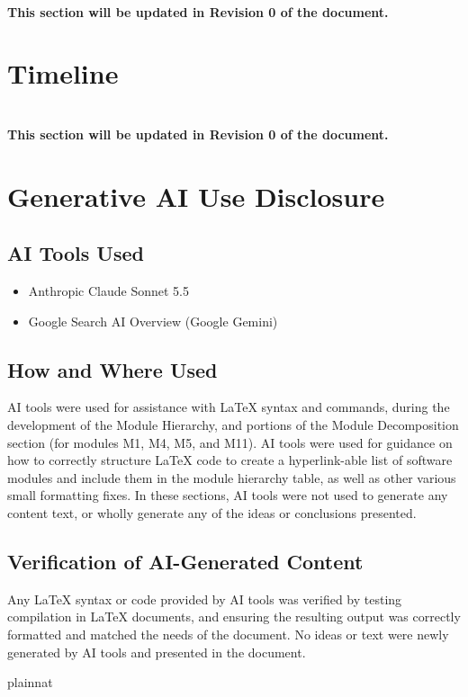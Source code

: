 \documentclass[12pt, titlepage]{article}
\begin{document}
\\

\noindent \textbf{This section will be updated in Revision 0 of the document.}

\section{Timeline}


\\

\noindent \textbf{This section will be updated in Revision 0 of the document.}

\newpage

\section{Generative AI Use Disclosure}

\subsection{AI Tools Used}

\begin{itemize}
	\item Anthropic Claude Sonnet 5.5
	\item Google Search AI Overview (Google Gemini)
\end{itemize}

\subsection{How and Where Used}

AI tools were used for assistance with LaTeX syntax and commands, during 
the development of the Module Hierarchy, and portions of the Module 
Decomposition section (for modules M1, M4, M5, and M11). AI tools were used for 
guidance on how to correctly 
structure LaTeX code to create a hyperlink-able list of software modules and 
include them in the module hierarchy table, as well as other various small 
formatting 
fixes. In these sections, 
AI tools were not used to generate any content text, or wholly generate any of 
the 
ideas or conclusions presented.

\subsection{Verification of AI-Generated Content}

Any LaTeX syntax or code provided by AI tools was verified by testing 
compilation in LaTeX documents, and ensuring the resulting output was 
correctly formatted and matched the needs of the document. No ideas or text 
were 
newly generated by AI tools and presented in the document.

\newpage{}

 {plainnat}

\end{document}
